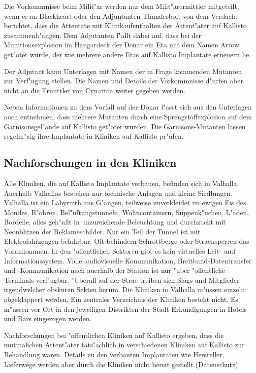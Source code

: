 Die Vorkommnisse beim Milit"ar werden nur dem Milit"arermittler mitgeteilt, wenn er an Blackheart oder den Adjuntanten Thunderbolt von dem Verdacht berichtet, dass die Attentate mit Klinikaufenthalten der Attent"ater auf Kallisto zusammenh"angen. Dem Adjutanten f"allt dabei auf, dass bei der Munitionsexplosion im Hangardeck der Donar ein Eta mit dem Namen Arrow get"otet wurde, der wie mehrere andere Etas auf Kallisto Implantate erneuern lie\3.

Der Adjutant kann Unterlagen mit Namen der in Frage kommenden Mutanten zur Verf"ugung stellen. Die Namen und Details der Vorkommnisse d"urfen aber nicht an die Ermittler von Cynarian weiter gegeben werden.

Neben Informationen zu dem Vorfall auf der Donar l"asst sich aus den Unterlagen auch entnehmen, dass mehrere Mutanten durch eine Sprengstoffexplosion auf dem Garnisonsgel"ande auf Kallisto get"otet wurden. Die Garnisons-Mutanten lassen regelm"a\3ig ihre Implantate in Kliniken auf Kallisto pr"ufen.

\subsection{Nachforschungen in den Kliniken}

Alle Kliniken, die auf Kallisto Implantate verbauen, befinden sich in Valhalla. Au\3erhalb Valhallas bestehen nur technische Anlagen und kleine Siedlungen. Valhalla ist ein Labyrinth aus G"angen, teilweise unverkleidet im ewigen Eis des Mondes, R"ohren, Bel"uftungstunneln, Wohncontainern, Suppenk"uchen, L"aden, Bordelle, alles geh"ullt in unzureichende Beleuchtung und durchzuckt mit Neonblitzen der Reklameschilder. Nur ein Teil der Tunnel ist mit Elektrofahrzeugen befahrbar. Oft behindern Schrottberge oder Stra\3ensperren das Vorankommen. In den "offentlichen Sektoren gibt es kein virtuelles Leit- und Informationssystem. Volle audiovisuelle Kommunikation, Breitband-Datentransfer und -Kommunikation nach au\3erhalb der Station ist nur "uber "offentliche Terminals verf"ugbar. "Uberall auf der Stra\3e treiben sich Slags und Mitglieder irgendwelcher obskuren Sekten herum. Die Kliniken in Valhalla m"ussen einzeln abgeklappert werden. Ein zentrales Verzeichnis der Kliniken besteht nicht. Es m"ussen vor Ort in den jeweiligen Distrikten der Stadt Erkundigungen in Hotels und Bars eingezogen werden.

Nachforschungen bei "offentlichen Kliniken auf Kallisto ergeben, dass die mutma\3lichen Attent"ater tats"achlich in verschiedenen Kliniken auf Kallisto zur Behandlung waren. Details zu den verbauten Implantaten wie Hersteller, Lieferwege werden aber durch die Kliniken nicht bereit gestellt (Datenschutz).

